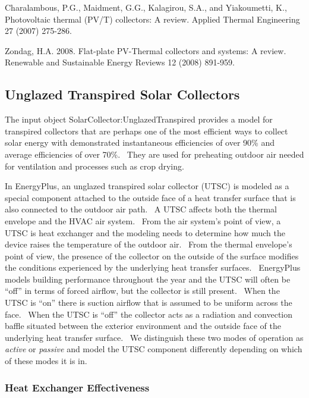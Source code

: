 Charalambous, P.G., Maidment, G.G., Kalagirou, S.A., and Yiakoumetti, K., Photovoltaic thermal (PV/T) collectors: A review. Applied Thermal Engineering 27 (2007) 275-286.

Zondag, H.A. 2008. Flat-plate PV-Thermal collectors and systems: A review.~ Renewable and Sustainable Energy Reviews 12 (2008) 891-959.

\subsection{Unglazed Transpired Solar Collectors}\label{unglazed-transpired-solar-collectors}

The input object SolarCollector:UnglazedTranspired provides a model for transpired collectors that are perhaps one of the most efficient ways to collect solar energy with demonstrated instantaneous efficiencies of over 90\% and average efficiencies of over 70\%.~ They are used for preheating outdoor air needed for ventilation and processes such as crop drying.

In EnergyPlus, an unglazed transpired solar collector (UTSC) is modeled as a special component attached to the outside face of a heat transfer surface that is also connected to the outdoor air path.~ A UTSC affects both the thermal envelope and the HVAC air system.~ From the air system's point of view, a UTSC is heat exchanger and the modeling needs to determine how much the device raises the temperature of the outdoor air.~ From the thermal envelope's point of view, the presence of the collector on the outside of the surface modifies the conditions experienced by the underlying heat transfer surfaces.~ EnergyPlus models building performance throughout the year and the UTSC will often be ``off'' in terms of forced airflow, but the collector is still present.~ When the UTSC is ``on'' there is suction airflow that is assumed to be uniform across the face.~ When the UTSC is ``off'' the collector acts as a radiation and convection baffle situated between the exterior environment and the outside face of the underlying heat transfer surface.~ We distinguish these two modes of operation as \emph{active} or \emph{passive} and model the UTSC component differently depending on which of these modes it is in.

\subsubsection{Heat Exchanger Effectiveness}\label{heat-exchanger-effectiveness}

